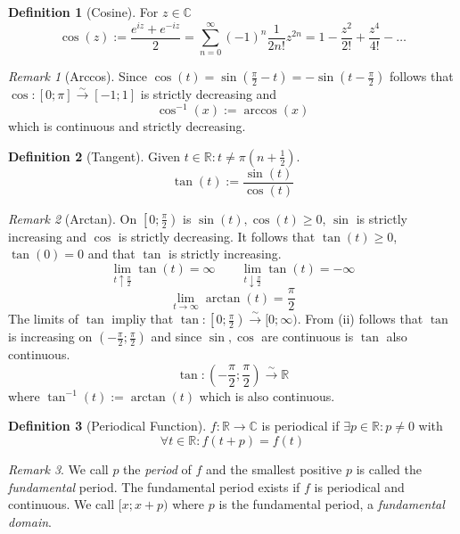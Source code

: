 \documentclass[english,titlepage]{uzhpub}
\theoremstyle{definition}
\newtheorem{definition}{Definition}[section]
\theoremstyle{plain}
\theoremstyle{remark}
\newtheorem*{remark}{Remark}
\theoremstyle{example}
\begin{document}
   \begin{definition}[Cosine]
      For \(z \in \mathbb{C}\)
      \[\cos(z) := \frac{e^{iz} + e^{-iz}}{2} = \sum_{n=0}^\infty (-1)^n \frac{1}{2n!} z^{2n} = 1 - \frac{z^2}{2!} + \frac{z^4}{4!} - \ldots\]
   \end{definition}
   \begin{remark}[Arccos]
      Since \(\cos(t) = \sin\left(\frac{\pi}{2} - t\right) = -\sin\left(t - \frac{\pi}{2}\right)\) follows that \(\cos: [0; \pi] \xrightarrow{\sim} [-1; 1]\) is strictly decreasing and
      \[\cos^{-1}(x) := \arccos(x)\]
      which is continuous and strictly decreasing.
   \end{remark}

   \begin{definition}[Tangent]
      Given \(t \in \mathbb{R}: t \neq \pi\left(n + \frac{1}{2}\right)\).
      \[\tan(t) := \frac{\sin(t)}{\cos(t)}\]
   \end{definition}
   \begin{remark}[Arctan]
      On \(\left[0;\frac{\pi}{2}\right)\) is \(\sin(t), \cos(t) \geq 0\), \(\sin\) is strictly increasing and \(\cos\) is strictly decreasing.
      It follows that \(\tan(t) \geq 0\), \(\tan(0) = 0\) and that \(\tan\) is strictly increasing.
      \[\lim_{t \uparrow \frac{\pi}{2}} \tan(t) = \infty \qquad \lim_{t \downarrow \frac{\pi}{2}} \tan(t) = -\infty\]
      \[\lim_{t \to \infty} \arctan(t) = \frac{\pi}{2}\]
      The limits of \(\tan\) impliy that \(\tan: \left[0; \frac{\pi}{2}\right) \xrightarrow{\sim} [0; \infty)\).
      From (ii) follows that \(\tan\) is increasing on \(\left(-\frac{\pi}{2}; \frac{\pi}{2}\right)\) and since \(\sin, \cos\) are continuous is \(\tan\) also continuous.
      \[\tan: \left(-\frac{\pi}{2}; \frac{\pi}{2}\right) \xrightarrow{\sim} \mathbb{R}\]
      where \(\tan^{-1}(t) := \arctan(t)\) which is also continuous.
   \end{remark}

   \begin{definition}[Periodical Function]
      \(f: \mathbb{R} \to \mathbb{C}\) is periodical if \(\exists p \in \mathbb{R}: p \neq 0\) with
      \[\forall t \in \mathbb{R}: f(t + p) = f(t)\]
   \end{definition}
   \begin{remark}
      We call \(p\) the \textit{period} of \(f\) and the smallest positive \(p\) is called the \textit{fundamental} period.
      The fundamental period exists if \(f\) is periodical and continuous.
      We call \([x; x + p)\) where \(p\) is the fundamental period, a \textit{fundamental domain}.
   \end{remark}
\end{document}
